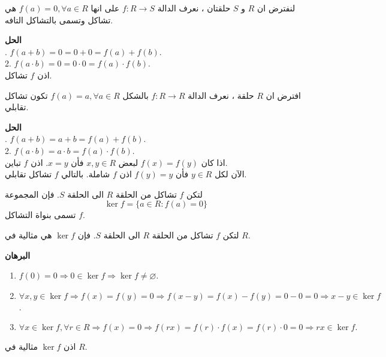\begin{example}
		لنفترض ان $R$ و $S$ حلقتان ، نعرف الدالة $f:R\to S$ على انها  $f(a) = 0, \forall a\in R$ هي تشاكل وتسمى بالتشاكل التافه.
\end{example}
\noindent
\textbf{الحل}\\
. $f(a + b) = 0 = 0 + 0 = f(a) + f(b)$.\\
2. $f(a\cdot b) = 0 = 0\cdot 0 = f(a ) \cdot f(b)$.\\
اذن $f$ تشاكل.

\begin{example}
	افترض ان $R$ حلقة ، نعرف الدالة $f : R\to R$ بالشكل 
	$f(a) = a, \forall a\in R$
	تكون تشاكل تقابلي.
\end{example}
\noindent
\textbf{الحل}\\
. $f(a + b) = a + b = f(a) + f(b)$.\\
2. $f(a\cdot b) = a\cdot b = f(a) \cdot f(b)$. \\
اذا كان 
$f(x) = f(y)$ لبعض $x,y \in R$ فأن $x=y$. اذن $f$ تباين.\\
الآن لكل $y\in R$ فأن $ f(y) = y$ اذن $f$ شاملة. بالتالي $f$ تشاكل تقابلي.

\begin{definition}
	لتكن $f$ تشاكل من الحلقة $R$ الى الحلقة $S$. فإن المجموعة 
	\[
	\ker f = \{a\in R : f(a) = 0\}
	\]
	تسمى بنواة التشاكل $f$.
\end{definition} 

\begin{theorem}
		لتكن $f$ تشاكل من الحلقة $R$ الى الحلقة $S$. فإن $\ker f$ هي مثالية في $R$.
\end{theorem}
\noindent
\textbf{البرهان}

\begin{english}
	\begin{enumerate}
		\item  $f(0) = 0 \Rightarrow 0 \in \ker f \Rightarrow \ker f \neq \varnothing$.
	\item  $\forall x, y\in \ker f \Rightarrow f(x) = f(y) = 0\Rightarrow f(x-y) = f(x) - f(y) = 0-0 =0 \Rightarrow x-y \in \ker f$.
	\item  $\forall x\in \ker f, \forall r\in R \Rightarrow f(x) = 0 \Rightarrow f(rx) = f(r)\cdot f(x) = f(r) \cdot 0 = 0 \Rightarrow rx \in \ker f.$
	\end{enumerate}
	\end{english}
	
	\noindent اذن $\ker f$ مثالية في $R$.
	
